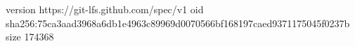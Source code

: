 version https://git-lfs.github.com/spec/v1
oid sha256:75ca3aad3968a6db1e4963c89969d0070566bf168197caed9371175045f0237b
size 174368
